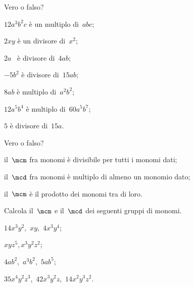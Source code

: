 \begin{esercizio}[\Ast]
 \label{ese:10.44} %
Vero o falso?

\begin{multicols}{2}
\begin{enumeratea}
\item $12a^{3}b^{2}c$ è un multiplo di~$abc$; %
\item $2xy$ è un divisore di~$x^{2}$; %
\item $2a$ \ è divisore di~$4ab$; %
\item $-5b^{2}$ è divisore di~$15ab$; %
\item $8ab$ è multiplo di~$a^{2}b^{2}$; %
\item $12a^{5}b^{4}$ è multiplo di~$60a^{5}b^{7}$; %
\item $5$ è divisore di~$15a$. %
\end{enumeratea}
\end{multicols}
\end{esercizio}
\begin{esercizio}[\Ast]
 \label{ese:10.45} %
Vero o falso?

\begin{enumeratea}
\item il~$\mcm$ fra monomi è divisibile per tutti i monomi dati; %
\item il~$\mcd$ fra monomi è multiplo di almeno un monomio dato; %
\item il~$\mcm$ è il prodotto dei monomi tra di loro. %
\end{enumeratea}
\end{esercizio}

\begin{esercizio}[\Ast]
 \label{ese:10.46} %
Calcola il~$\mcm$ e il~$\mcd$ dei seguenti gruppi di monomi.
\begin{multicols}{2}
\begin{enumeratea}
 \item $14x^{3}y^{2}$,\, $xy$,\, $4x^{3}y^{4}$;
 \item $xyz^{5}$,\,$x^{3}y^{2}z^{2}$;
 \item $4ab^{2}$,\, $a^{3}b^{2}$,\, $5ab^{5}$;
 \item $35x^4y^2z^3$,\, $42x^3y^2z$,\, $14x^2y^3z^2$.
\end{enumeratea}
\end{multicols}
\end{esercizio}

